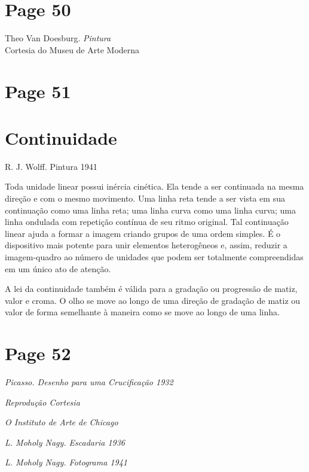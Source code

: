 \documentclass[a4paper]{article}
\begin{document}
\vfill
{}

\newpage
\section*{Page 50}

Theo Van Doesburg. \textit{Pintura}\\
Cortesia do Museu de Arte Moderna

\newpage
\section*{Page 51}

\section*{Continuidade}

\hfill R. J. Wolff. Pintura 1941

Toda unidade linear possui inércia cinética. Ela tende a ser continuada na mesma direção e com o mesmo movimento. Uma linha reta tende a ser vista em sua continuação como uma linha reta; uma linha curva como uma linha curva; uma linha ondulada com repetição contínua de seu ritmo original. Tal continuação linear ajuda a formar a imagem criando grupos de uma ordem simples. É o dispositivo mais potente para unir elementos heterogêneos e, assim, reduzir a imagem-quadro ao número de unidades que podem ser totalmente compreendidas em um único ato de atenção.

A lei da continuidade também é válida para a gradação ou progressão de matiz, valor e croma. O olho se move ao longo de uma direção de gradação de matiz ou valor de forma semelhante à maneira como se move ao longo de uma linha.

\vfill
{}

\newpage
\section*{Page 52}

\noindent\textit{Picasso. Desenho para uma Crucificação 1932}\par
\noindent\textit{Reprodução Cortesia}\par
\noindent\textit{O Instituto de Arte de Chicago}\par
\par
\par
\noindent\textit{L. Moholy Nagy. Escadaria 1936}\par
\par
\par
\par
\noindent\textit{L. Moholy Nagy. Fotograma 1941}\par
\par
\par
\par
{}
\end{document}
